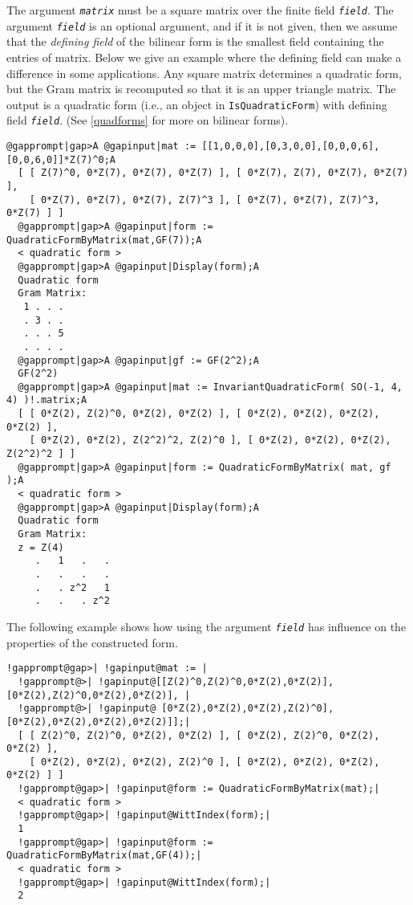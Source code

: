 \documentclass[a4paper,11pt]{report}
\begin{document}
{{{ The argument \mbox{\texttt{\mdseries\slshape matrix}} must be a square matrix over the finite field \mbox{\texttt{\mdseries\slshape field}}. The argument \mbox{\texttt{\mdseries\slshape field}} is an optional argument, and if it is not given, then we assume that the \emph{defining field} of the bilinear form is the smallest field containing the entries of matrix.
Below we give an example where the defining field can make a difference in
some applications. Any square matrix determines a quadratic form, but the Gram
matrix is recomputed so that it is an upper triangle matrix. The output is a
quadratic form (i.e., an object in \texttt{IsQuadraticForm}) with defining field \mbox{\texttt{\mdseries\slshape field}}. (See \ref{quadforms} for more on bilinear forms). 
\begin{Verbatim}[commandchars=@|A,fontsize=\small,frame=single,label=Example]
  @gapprompt|gap>A @gapinput|mat := [[1,0,0,0],[0,3,0,0],[0,0,0,6],[0,0,6,0]]*Z(7)^0;A
  [ [ Z(7)^0, 0*Z(7), 0*Z(7), 0*Z(7) ], [ 0*Z(7), Z(7), 0*Z(7), 0*Z(7) ], 
    [ 0*Z(7), 0*Z(7), 0*Z(7), Z(7)^3 ], [ 0*Z(7), 0*Z(7), Z(7)^3, 0*Z(7) ] ]
  @gapprompt|gap>A @gapinput|form := QuadraticFormByMatrix(mat,GF(7));A
  < quadratic form >
  @gapprompt|gap>A @gapinput|Display(form);A
  Quadratic form
  Gram Matrix:
   1 . . .
   . 3 . .
   . . . 5
   . . . .
  @gapprompt|gap>A @gapinput|gf := GF(2^2);A
  GF(2^2)
  @gapprompt|gap>A @gapinput|mat := InvariantQuadraticForm( SO(-1, 4, 4) )!.matrix;A
  [ [ 0*Z(2), Z(2)^0, 0*Z(2), 0*Z(2) ], [ 0*Z(2), 0*Z(2), 0*Z(2), 0*Z(2) ], 
    [ 0*Z(2), 0*Z(2), Z(2^2)^2, Z(2)^0 ], [ 0*Z(2), 0*Z(2), 0*Z(2), Z(2^2)^2 ] ]
  @gapprompt|gap>A @gapinput|form := QuadraticFormByMatrix( mat, gf );A
  < quadratic form >
  @gapprompt|gap>A @gapinput|Display(form);A
  Quadratic form
  Gram Matrix:
  z = Z(4)
     .   1   .   .
     .   .   .   .
     .   . z^2   1
     .   .   . z^2 
\end{Verbatim}
 The following example shows how using the argument \mbox{\texttt{\mdseries\slshape field}} has influence on the properties of the constructed form. 
\begin{Verbatim}[commandchars=!@|,fontsize=\small,frame=single,label=Example]
  !gapprompt@gap>| !gapinput@mat := |
  !gapprompt@>| !gapinput@[[Z(2)^0,Z(2)^0,0*Z(2),0*Z(2)],[0*Z(2),Z(2)^0,0*Z(2),0*Z(2)], |
  !gapprompt@>| !gapinput@ [0*Z(2),0*Z(2),0*Z(2),Z(2)^0],[0*Z(2),0*Z(2),0*Z(2),0*Z(2)]];|
  [ [ Z(2)^0, Z(2)^0, 0*Z(2), 0*Z(2) ], [ 0*Z(2), Z(2)^0, 0*Z(2), 0*Z(2) ], 
    [ 0*Z(2), 0*Z(2), 0*Z(2), Z(2)^0 ], [ 0*Z(2), 0*Z(2), 0*Z(2), 0*Z(2) ] ]
  !gapprompt@gap>| !gapinput@form := QuadraticFormByMatrix(mat);|
  < quadratic form >
  !gapprompt@gap>| !gapinput@WittIndex(form);|
  1
  !gapprompt@gap>| !gapinput@form := QuadraticFormByMatrix(mat,GF(4));|
  < quadratic form >
  !gapprompt@gap>| !gapinput@WittIndex(form);|
  2 
\end{Verbatim}
 }

}}
\end{document}
